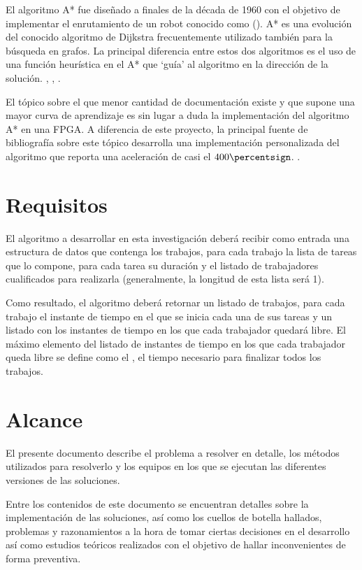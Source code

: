El algoritmo A* fue diseñado a finales de la década de 1960
con el objetivo de implementar el enrutamiento de un robot
conocido como  (\cite{Nil84}).
A* es una evolución del conocido algoritmo de Dijkstra
frecuentemente utilizado también para la búsqueda en grafos.
La principal diferencia entre estos dos algoritmos es el
uso de una función heurística en el A* que `guía' al algoritmo
en la dirección de la solución.
\cite{HNR68}, \cite{MSV13}, \cite{Kon14}.

El tópico sobre el que menor cantidad de documentación existe
y que supone una mayor curva de aprendizaje es sin lugar a duda
la implementación del algoritmo A* en una FPGA.
A diferencia de este proyecto, la principal fuente de bibliografía
sobre este tópico desarrolla una implementación personalizada del algoritmo
que reporta una aceleración de casi el $400\percentsign$.
\cite{ZJW20}.

\section{Requisitos}

El algoritmo a desarrollar en esta investigación deberá recibir como entrada
una estructura de datos que contenga los trabajos,
para cada trabajo la lista de tareas que lo compone,
para cada tarea su duración y el listado de trabajadores cualificados para realizarla
(generalmente, la longitud de esta lista será 1).

Como resultado, el algoritmo deberá retornar un listado de trabajos,
para cada trabajo el instante de tiempo en el que se inicia cada una de sus tareas
y un listado con los instantes de tiempo en los que cada trabajador quedará libre.
El máximo elemento del listado de instantes de tiempo en los que cada trabajador queda libre
se define como el , el tiempo necesario para finalizar todos los trabajos.

\section{Alcance}

El presente documento describe el problema a resolver en detalle,
los métodos utilizados para resolverlo y
los equipos en los que se ejecutan las diferentes versiones de las soluciones.

Entre los contenidos de este documento se encuentran detalles sobre
la implementación de las soluciones, así como
los cuellos de botella hallados, problemas y razonamientos a la hora de
tomar ciertas decisiones en el desarrollo así como estudios teóricos
realizados con el objetivo de hallar inconvenientes de forma preventiva.
